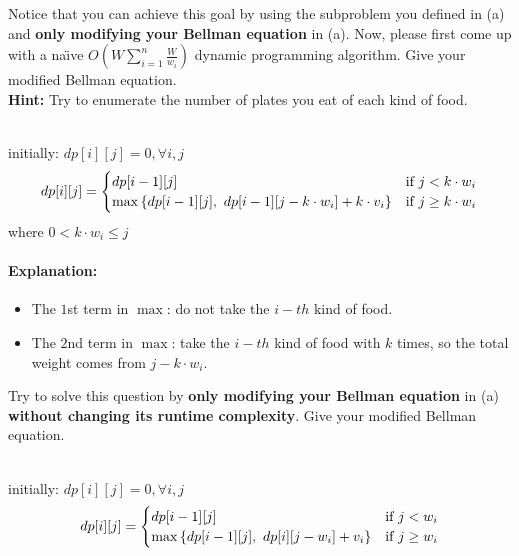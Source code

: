 \begin{parts}
	\begin{subparts}
		\subpart[3] Notice that you can achieve this goal by using the subproblem you defined in (a) and \textbf{only modifying your Bellman equation} in (a). Now, please first come up with a na\"{\i}ve $O(W\sum^n_{i=1}{\frac{W}{w_i}})$ dynamic programming algorithm. Give your modified Bellman equation.\\
		\textbf{Hint:} Try to enumerate the number of plates you eat of each kind of food.
		\begin{solution}
			\\initially: $dp[i][j] = 0, \forall i,j$\\
			\[
				dp[i][j]=
				\begin{cases}
					dp[i-1][j]                      & \text{if}\ j< k\cdot w_i \\
					\max\left\{dp[i-1][j],\ dp[i-1][j-k\cdot w_i] + k\cdot v_i\right\} & \text{if}\ j\geq k\cdot w_i
				\end{cases}
			\]
			where $0 < k\cdot w_i \leq j$\\
			\paragraph{Explanation:}
			\begin{itemize}
				\item The $1$st term in $\max$: do not take the $i-th$ kind of food.
				\item The $2$nd term in $\max$: take the $i-th$ kind of food with $k$ times, so the total weight comes from $j-k\cdot w_i$.
			\end{itemize}
		\end{solution}

		\subpart[4] Try to solve this question by \textbf{only modifying your Bellman equation} in (a) \textbf{without changing its runtime complexity}. Give your modified Bellman equation.
		\begin{solution}
			\\initially: $dp[i][j] = 0, \forall i,j$\\
			\[
				dp[i][j]=
				\begin{cases}
					dp[i-1][j]                      & \text{if}\ j< w_i \\
					\max\left\{dp[i-1][j],\ dp[i][j-w_i] + v_i\right\} & \text{if}\ j\geq w_i
				\end{cases}
			\]

\end{solution}
\end{subparts}
\end{parts}
